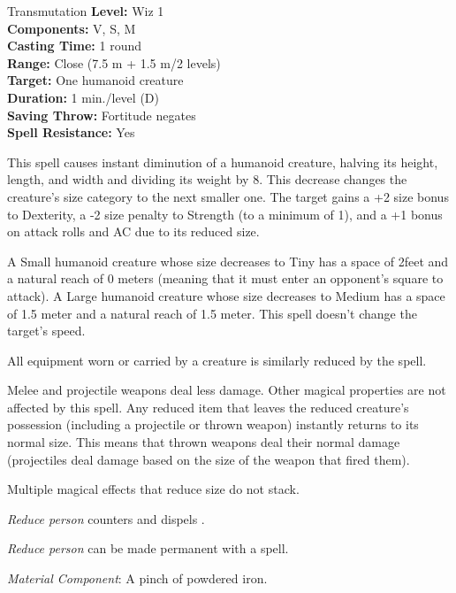 {Transmutation}
{
	\textbf{Level:}
	Wiz 1\\
	\textbf{Components:}
	V, S, M\\
	\textbf{Casting Time:}
	1 round\\
	\textbf{Range:}
	Close (7.5 m + 1.5 m/2 levels)\\
	\textbf{Target:}
	One humanoid creature\\
	\textbf{Duration:}
	1 min./level (D)\\
	\textbf{Saving Throw:}
	Fortitude negates\\
	\textbf{Spell Resistance:}
	Yes\\
}
{
	This spell causes instant diminution of a humanoid creature, halving its height, length, and width and dividing its weight by 8. This decrease changes the creature's size category to the next smaller one. The target gains a +2 size bonus to Dexterity, a -2 size penalty to Strength (to a minimum of 1), and a +1 bonus on attack rolls and AC due to its reduced size.

	A Small humanoid creature whose size decreases to Tiny has a space of 2\onehalf feet and a natural reach of 0 meters (meaning that it must enter an opponent's square to attack). A Large humanoid creature whose size decreases to Medium has a space of 1.5 meter and a natural reach of 1.5 meter. This spell doesn't change the target's speed.

	All equipment worn or carried by a creature is similarly reduced by the spell.

	Melee and projectile weapons deal less damage. Other magical properties are not affected by this spell. Any reduced item that leaves the reduced creature's possession (including a projectile or thrown weapon) instantly returns to its normal size. This means that thrown weapons deal their normal damage (projectiles deal damage based on the size of the weapon that fired them).

	Multiple magical effects that reduce size do not stack.

	\emph{Reduce person} counters and dispels .

	\emph{Reduce person} can be made permanent with a  spell.

	\textit{Material Component}:
	A pinch of powdered iron.

}
